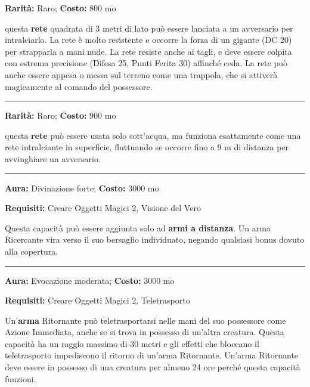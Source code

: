 \begin{multicols}{2}
\textbf{Rarità:} Raro; \textbf{Costo:} 800 mo

questa \textbf{rete} quadrata di 3 metri di lato può essere lanciata a un avversario per intralciarlo. La rete è molto resistente e occorre la forza di un gigante (DC 20) per strapparla a mani nude. La rete resiste anche ai tagli, e deve essere colpita con estrema precisione (Difesa 25, Punti Ferita 30) affinché ceda. La rete può anche essere appesa o messa sul terreno come una trappola, che si attiverà magicamente al comando del possessore.

\smallskip\noindent\rule{\linewidth}{2pt}  \hypertarget{ReteIntrappolante}{}\smallskip{}\noindent\label{ReteIntrappolante}

\textbf{Rarità:} Raro; \textbf{Costo:} 900 mo

questa \textbf{rete} può essere usata solo sott'acqua, ma funziona esattamente come una rete intralciante in superficie, fluttuando se occorre fino a 9 m di distanza per avvinghiare un avversario.

\smallskip\noindent\rule{\linewidth}{2pt}  \hypertarget{Ricercante}{}\smallskip{}\noindent\label{Ricercante}

\textbf{Aura:} Divinazione forte; \textbf{Costo:} 3000 mo

\textbf{Requisiti:} Creare Oggetti Magici 2, Visione del Vero

Questa capacità può essere aggiunta solo ad \textbf{armi a distanza}. Un arma Ricercante vira verso il suo bersaglio individuato, negando qualsiasi bonus dovuto alla copertura.

\smallskip\noindent\rule{\linewidth}{2pt}  \hypertarget{Ritornante}{}\smallskip{}\noindent\label{Ritornante}

\textbf{Aura:} Evocazione moderata; \textbf{Costo:} 3000 mo

\textbf{Requisiti:} Creare Oggetti Magici 2, Teletrasporto

Un'\textbf{arma} Ritornante può teletrasportarsi nelle mani del suo possessore come Azione Immediata, anche se si trova in possesso di un'altra creatura. Questa capacità ha un raggio massimo di 30 metri e gli effetti che bloccano il teletrasporto impediscono il ritorno di un'arma Ritornante. Un'arma Ritornante deve essere in possesso di una creatura per almeno 24 ore perché questa capacità funzioni.


\end{multicols}
